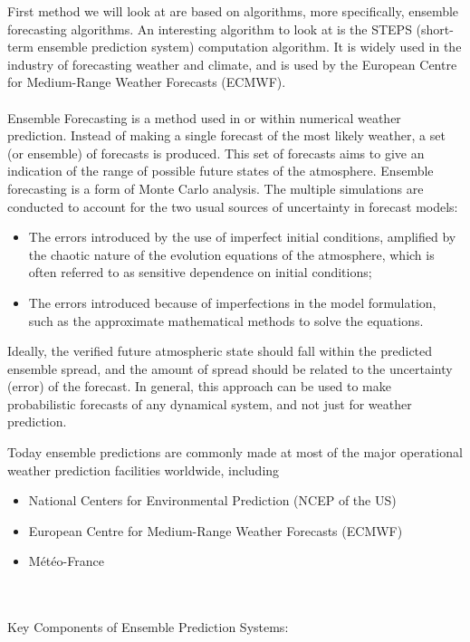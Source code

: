 \documentclass[../paper.tex]{subfiles}
\begin{document}
    First method we will look at are based on algorithms, more specifically, ensemble forecasting algorithms.
    An interesting algorithm to look at is the STEPS (short-term ensemble prediction system) computation algorithm.
    It is widely used in the industry of forecasting weather and climate, and is used by the European Centre for Medium-Range Weather Forecasts (ECMWF)\cite{a1, b4}. \\
    \\
    Ensemble Forecasting is a method used in or within numerical weather prediction.
    Instead of making a single forecast of the most likely weather, a set (or ensemble) of forecasts is produced.
    This set of forecasts aims to give an indication of the range of possible future states of the atmosphere.
    Ensemble forecasting is a form of Monte Carlo analysis.
    The multiple simulations are conducted to account for the two usual sources of uncertainty in forecast models:
    \begin{itemize}
        \item The errors introduced by the use of imperfect initial conditions, amplified by the chaotic nature of the evolution equations of the atmosphere, which is often referred to as sensitive dependence on initial conditions;
        \item The errors introduced because of imperfections in the model formulation, such as the approximate mathematical methods to solve the equations.
    \end{itemize}
    Ideally, the verified future atmospheric state should fall within the predicted ensemble spread,
    and the amount of spread should be related to the uncertainty (error) of the forecast.
    In general, this approach can be used to make probabilistic forecasts of any dynamical system,
    and not just for weather prediction\cite{a1}.

    Today ensemble predictions are commonly made at most of the major operational weather prediction facilities worldwide,
    including
    \begin{itemize}
        \item National Centers for Environmental Prediction (NCEP of the US)
        \item European Centre for Medium-Range Weather Forecasts (ECMWF)
        \item M\'et\'eo-France
    \end{itemize}\cite{a1}
    \\\\
    Key Components of Ensemble Prediction Systems:
\end{document}
